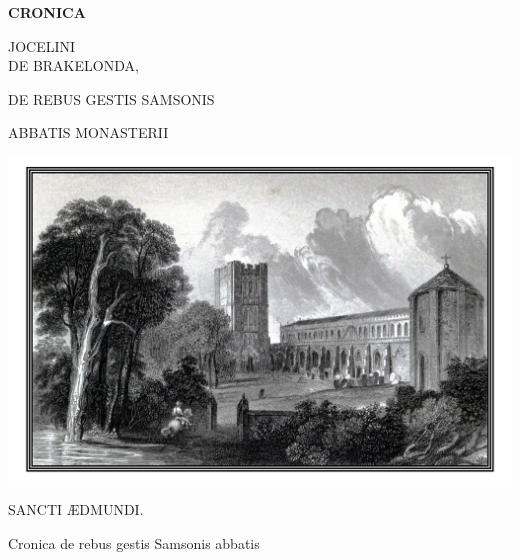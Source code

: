 \documentclass{book}
\begin{document}

{\fontsize{11}{11} \selectfont

\begin{titlepage}
\begin{center}
{\bfseries \lsstyle
{\Large CRONICA}

\vspace{0cm}

{\color{BrickRed} \Huge JOCELINI \\ \vspace*{0.5cm} DE BRAKELONDA,}

\vspace{0.4cm}

{\Large DE REBUS GESTIS SAMSONIS}

\vspace{0.2cm}

{\Large ABBATIS MONASTERII}

\vspace{0.4cm}

\includegraphics[scale=0.37]{fig/abbey.png}

\vspace{0.4cm}

{\color{BrickRed} \Huge SANCTI \AE{}DMUNDI.}

\vspace{0.2cm}

}
\end{center}
\end{titlepage}


\thispagestyle{empty}
\begin{center}

{\setlength{\parskip}{3mm}

Cronica de rebus gestis Samsonis abbatis
 
}
\end{center}}
\end{document}
